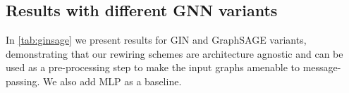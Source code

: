 \begin{table}[ht]
\centering
\caption{Node classification results on Physics dataset with node sampling.}
\label{tab:physsampling}
\end{table}




\subsection{Results with different GNN variants}\label{app:ginsage}
In \autoref{tab:ginsage} we present results for GIN \citep{xu2018how} and GraphSAGE \citep{grapsage} variants, demonstrating that our rewiring schemes are architecture agnostic and can be used as a pre-processing step to make the input graphs amenable to message-passing. We also add MLP as a baseline.


